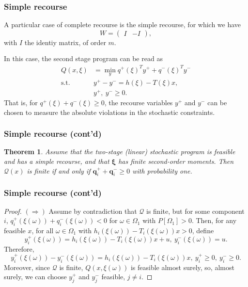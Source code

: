 \documentclass{beamer}
\newtheorem{theo}{Theorem}
\def\bxi{\boldsymbol\xi}
\def\bxi{\boldsymbol\xi}
\begin{document}
\begin{frame}
\frametitle{Simple recourse}

A particular case of complete recourse is the {\red simple recourse}, for which we have
\[
W = \begin{pmatrix} I & -I \end{pmatrix},
\]
with $I$ the identiy matrix, of order $m$.

\mbox{}

In this case, the second stage program can be read as
\begin{align*}
Q(x,\xi) & = \min_y q^+(\xi)^Ty^+ + q^-(\xi)^Ty^- \\
\mbox{s.t. } & y^+ - y^- = h(\xi)-T(\xi)x,\\
& y^+,\ y^- \geq 0.
\end{align*}
That is, for $q^+(\xi) + q^-(\xi) \geq 0$, the recourse variables $y^+$ and $y^-$ can be chosen to %
measure the absolute violations in the stochastic constraints.

\end{frame}

\begin{frame}
\frametitle{Simple recourse (cont'd)}

\begin{theo}
Assume that the two-stage (linear) stochastic program is feasible and has a simple recourse, and that $\bxi$ has finite second-order moments.
Then $\mathcal{Q}(x)$ is finite if and only if $\boldsymbol{q}_i^+ + \boldsymbol{q}_i^- \geq 0$ with probability one.
\end{theo}

\end{frame}

\begin{frame}
\frametitle{Simple recourse (cont'd)}

\begin{proof}
{\bf $(\Rightarrow)$} 
Assume by contradiction that $\mathcal{Q}$ is finite, but for some component $i$, $q_i^+(\xi(\omega)) + q_i^-(\xi(\omega)) < 0$ for $\omega \in \Omega_1$ with $P[\Omega_1] > 0$.
Then, for any feasible $x$, for all $\omega \in \Omega_1$ with $h_i(\xi(\omega))-T_i(\xi(\omega))x > 0$, define
$$
y_i^+(\xi(\omega)) = h_i(\xi(\omega)) - T_i(\xi(\omega))x + u,\  y_i^-(\xi(\omega)) = u.
$$
Therefore, 
$$
y_i^+(\xi(\omega)) - y_i^-(\xi(\omega)) = h_i(\xi(\omega)) - T_i(\xi(\omega))x,\ y_i^+ \geq 0,\ y_i^- \geq 0.
$$
Moreover, since $\mathcal{Q}$ is finite, $Q(x, \xi(\omega))$ is feasible almost surely,
so, almost surely, we can choose $y_j^+$ and $y_j^-$ feasible, $j \ne i$.

\end{proof}

\end{frame}
\end{document}
